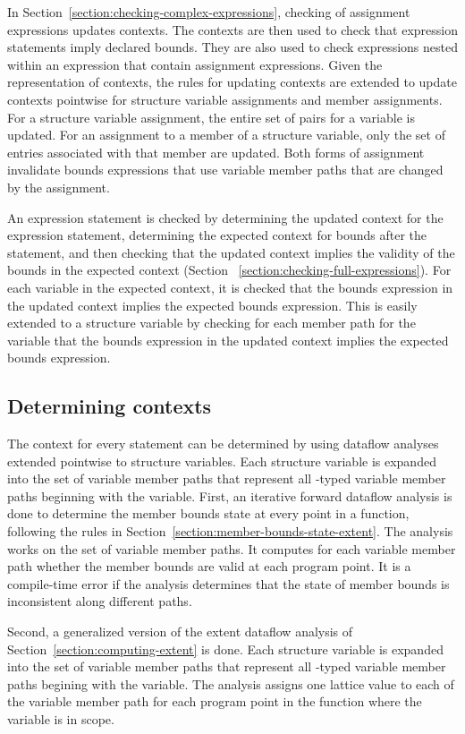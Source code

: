 \begin{enumerate}
In Section~\ref{section:checking-complex-expressions}, checking of assignment
expressions updates contexts.  The contexts are then used to check that expression
statements imply declared bounds.  They are also used to check expressions nested
within an expression that contain assignment expressions. 
Given the representation of contexts, the rules for updating contexts
are extended to update contexts pointwise for structure variable assignments and member 
assignments.  For a structure variable assignment, the entire set of pairs for a
variable is updated.  For an assignment to a member of a  structure variable,
only the set of entries  associated with that member are updated.  Both forms of assignment
invalidate bounds expressions that use variable member paths that are changed by the
assignment.

An expression statement is checked by determining the updated context for the
expression statement, determining the expected context for bounds after 
the statement, and then checking that the updated context implies the
validity of the bounds in the expected context (Section ~\ref{section:checking-full-expressions}).
For each variable in the expected context, it is checked that the bounds expression in
the updated context implies the expected bounds expression.  This is easily 
extended to a structure variable by checking for each member path for 
the variable that the bounds expression in the updated context implies
the expected bounds expression.

\subsection{Determining contexts}

The context for every statement can be determined by using dataflow analyses extended
pointwise to structure variables.  Each structure variable is expanded into the set
of variable member paths that represent all \arrayptr-typed variable member paths beginning
with the variable.  First, an iterative forward dataflow analysis is done to determine the
member bounds state at every point in a function, following the rules in
Section~\ref{section:member-bounds-state-extent}.  The analysis works on the set of variable
member paths.   It computes for each variable member path whether the member bounds are valid 
at each program point.  It is a compile-time error if the analysis determines that the state of
member bounds is inconsistent along different paths.

Second, a generalized version of the extent dataflow analysis of Section~\ref{section:computing-extent}
is done.  Each structure variable is expanded into the set of variable
member paths that represent all \arrayptr-typed variable member paths begining with 
the variable.  The analysis assigns one lattice value to each of the variable member path for
each program point in the function where the variable is in scope.


\end{enumerate}

